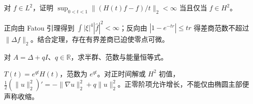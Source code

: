 \begin{exercise}[初值与零点导数]\label{ex:y14-heat-domain}
对 $f\in L^2$，证明 $\sup_{0<t<1}\|(H(t)f-f)/t\|_2<\infty$ 当且仅当 $f\in H^2$。
\end{exercise}
\begin{solution}
正向由 Fatou 引理得到 $\int|\xi|^4|\widehat f|^2<\infty$；反向由 $|1-e^{-tr}|\le tr$ 得差商范数不超过 $\|\Delta f\|_2$。结合定理，存在有界差商已迫使零点可微。
\end{solution}

\begin{exercise}[零阶项的增长]\label{ex:y14-growth-shift}
对 $A=\Delta+qI$、$q\in\mathbb R$，求半群、范数与能量恒等式。
\end{exercise}
\begin{solution}
$T(t)=e^{qt}H(t)$，范数为 $e^{qt}$。对正时间解或 $H^2$ 初值，$\tfrac12(\|u\|_2^2)'=-\|\nabla u\|_2^2+q\|u\|_2^2$。正零阶项允许增长，不能仅由椭圆主部便声称收缩。
\end{solution}

